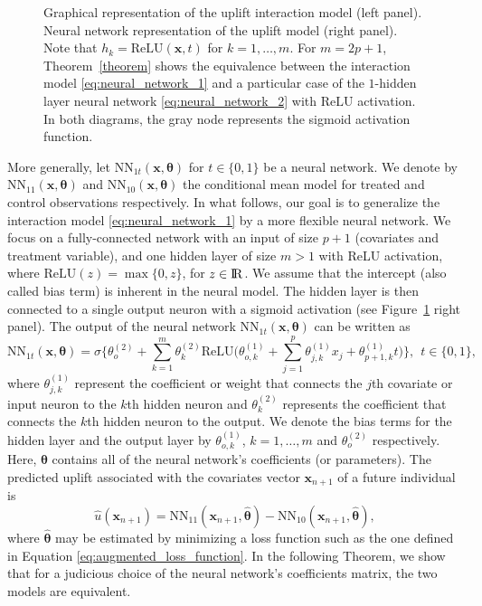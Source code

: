 \documentclass{article}
\def\x{\mathbf x}
\def \real{\rm I\!R}
\begin{document}
\begin{figure}[!ht]
    \centering
    
    \caption{Graphical representation of the uplift interaction model (left panel). Neural network representation of the uplift model (right panel). Note that $h_k = \mathrm{ReLU}(\x,t)$ for $k=1,\ldots,m$. For $m=2p+1$,  Theorem~\ref{theorem} shows the equivalence between the interaction model \eqref{eq:neural_network_1} and a particular case of the $1$-hidden layer neural network \eqref{eq:neural_network_2} with  $\mathrm{ReLU}$ activation. In both diagrams, the gray node represents the sigmoid activation function.}
    \label{fig:int_as_nn}
\end{figure}


More generally, let $\mathrm{NN}_{1t}(\x, \boldsymbol{\theta})$ for $t \in \{0,1\}$ be a neural network. We denote by $\mathrm{NN}_{11}(\x, \boldsymbol{\theta})$ and $\mathrm{NN}_{10}(\x, \boldsymbol{\theta})$ the conditional mean model for treated and control observations respectively. In what follows, our goal is to generalize the interaction model \eqref{eq:neural_network_1} by a more flexible neural network. We focus on a fully-connected network with an input of size $p+1$ (covariates and treatment variable), and one hidden layer of size $m>1$ with ReLU activation, where $\mathrm{ReLU}(z) = \max\{0,z\}$, for $z \in \real$. We assume that the intercept (also called bias term) is inherent in the neural model. The hidden layer is then connected to a single output neuron with a sigmoid activation (see Figure~\ref{fig:int_as_nn} right panel). The output of the neural network $\mathrm{NN}_{1t}(\x, \boldsymbol{\theta})$ can be written as
\begin{equation}
    \mathrm{NN}_{1t}(\x, \boldsymbol{\theta}) = \sigma \biggl\{ \theta_o^{(2)} + \sum_{k=1}^{m} \theta_k^{(2)}  \mathrm{ReLU}\Big(\theta_{o,k}^{(1)} + \sum_{j=1}^{p} \theta_{j,k}^{(1)} x_j +  \theta_{p+1,k}^{(1)} t \Big)  \biggr\}, ~~ t \in \{0,1\},
    \label{eq:neural_network_2}
\end{equation}
where $\theta_{j,k}^{(1)}$ represent the coefficient or weight that connects the $j$th covariate or input neuron to the $k$th hidden neuron and $\theta_k^{(2)}$ represents the coefficient that connects the $k$th hidden neuron to the output. We denote the bias terms for the hidden layer and the output layer by $\theta_{o,k}^{(1)}$, $k=1,\ldots,m$  and $\theta_o^{(2)}$ respectively. Here, $\boldsymbol{\theta}$ contains all of the neural network's coefficients (or parameters). The predicted uplift associated with the covariates vector $\mathbf{x}_{n+1}$ of a future individual is 
$$ \hat{u}(\mathbf{x}_{n+1}) = \mathrm{NN}_{11}(\x_{n+1}, \boldsymbol{\hat{\theta}}) - \mathrm{NN}_{10}(\x_{n+1}, \boldsymbol{\hat{\theta}}),$$
where $\boldsymbol{\hat{\theta}}$ may be estimated by minimizing a loss function such as the one defined in Equation \eqref{eq:augmented_loss_function}. In the following Theorem, we show that for a judicious choice of the neural network's coefficients matrix, the two models are equivalent.\\
\end{document}
